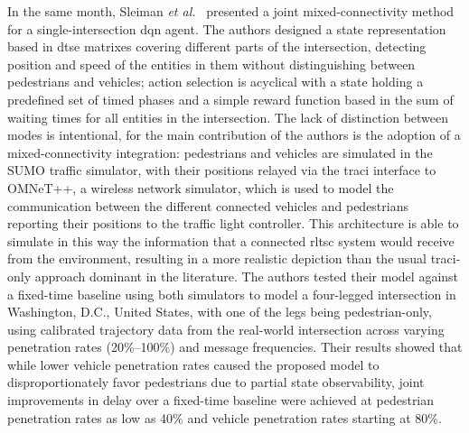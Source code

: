 In the same month, Sleiman \textit{et al.}~\cite{Sleiman2025} presented a joint mixed-connectivity method for a single-intersection \gls{dqn} agent. The authors designed a state representation based in \gls{dtse} matrixes covering different parts of the intersection, detecting position and speed of the entities in them without distinguishing between pedestrians and vehicles; action selection is acyclical with a state holding a predefined set of timed phases and a simple reward function based in the sum of waiting times for all entities in the intersection. The lack of distinction between modes is intentional, for the main contribution of the authors is the adoption of a mixed-connectivity integration: pedestrians and vehicles are simulated in the SUMO traffic simulator, with their positions relayed via the \gls{traci} interface to OMNeT++, a wireless network simulator, which is used to model the communication between the different connected vehicles and pedestrians reporting their positions to the traffic light controller. This architecture is able to simulate in this way the information that a connected \gls{rltsc} system would receive from the environment, resulting in a more realistic depiction than the usual \gls{traci}-only approach dominant in the literature. The authors tested their model against a fixed-time baseline using both simulators to model a four-legged intersection in Washington, D.C., United States, with one of the legs being pedestrian-only, using calibrated trajectory data from the real-world intersection across varying penetration rates (20\%–100\%) and message frequencies. Their results showed that while lower vehicle penetration rates caused the proposed model to disproportionately favor pedestrians due to partial state observability, joint improvements in delay over a fixed-time baseline were achieved at pedestrian penetration rates as low as 40\% and vehicle penetration rates starting at 80\%.

\medskip

